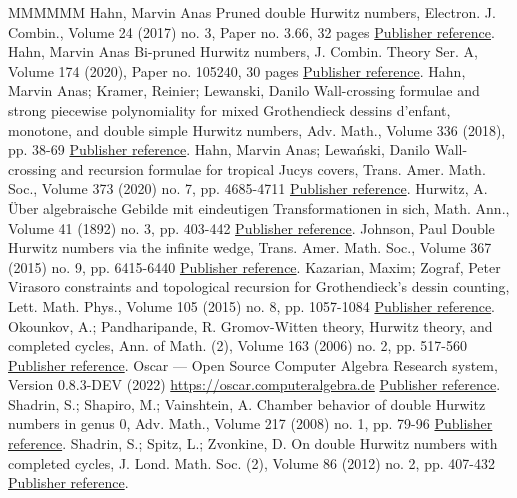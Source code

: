 \documentclass[11pt]{article}
\theoremstyle{definition}
\numberwithin{equation}{section}
\begin{document}
\begin{thebibliography}{MMMMMM}
 Hahn, Marvin Anas Pruned double Hurwitz numbers, Electron. J. Combin., Volume 24 (2017) no. 3, Paper no. 3.66, 32 pages \href{https://alco.centre-mersenne.org/articles/10.5802/alco.368/#zbMATH06791415}{Publisher reference}.
 Hahn, Marvin Anas Bi-pruned Hurwitz numbers, J. Combin. Theory Ser. A, Volume 174 (2020), Paper no. 105240, 30 pages \href{https://alco.centre-mersenne.org/articles/10.5802/alco.368/#hahn2020bi}{Publisher reference}.
 Hahn, Marvin Anas; Kramer, Reinier; Lewanski, Danilo Wall-crossing formulae and strong piecewise polynomiality for mixed Grothendieck dessins d’enfant, monotone, and double simple Hurwitz numbers, Adv. Math., Volume 336 (2018), pp. 38-69 \href{https://alco.centre-mersenne.org/articles/10.5802/alco.368/#hahn2018wall}{Publisher reference}.
 Hahn, Marvin Anas; Lewański, Danilo Wall-crossing and recursion formulae for tropical Jucys covers, Trans. Amer. Math. Soc., Volume 373 (2020) no. 7, pp. 4685-4711 \href{https://alco.centre-mersenne.org/articles/10.5802/alco.368/#hahn2020wall}{Publisher reference}.
 Hurwitz, A. Über algebraische Gebilde mit eindeutigen Transformationen in sich, Math. Ann., Volume 41 (1892) no. 3, pp. 403-442 \href{https://alco.centre-mersenne.org/articles/10.5802/alco.368/#hurwitz1892algebraische}{Publisher reference}.
 Johnson, Paul Double Hurwitz numbers via the infinite wedge, Trans. Amer. Math. Soc., Volume 367 (2015) no. 9, pp. 6415-6440 \href{https://alco.centre-mersenne.org/articles/10.5802/alco.368/#Joh15}{Publisher reference}.
 Kazarian, Maxim; Zograf, Peter Virasoro constraints and topological recursion for Grothendieck’s dessin counting, Lett. Math. Phys., Volume 105 (2015) no. 8, pp. 1057-1084 \href{https://alco.centre-mersenne.org/articles/10.5802/alco.368/#kazarian2015virasoro}{Publisher reference}.
 Okounkov, A.; Pandharipande, R. Gromov-Witten theory, Hurwitz theory, and completed cycles, Ann. of Math. (2), Volume 163 (2006) no. 2, pp. 517-560 \href{https://alco.centre-mersenne.org/articles/10.5802/alco.368/#okounkov2006gromov}{Publisher reference}.
 Oscar — Open Source Computer Algebra Research system, Version 0.8.3-DEV (2022) \url{https://oscar.computeralgebra.de} \href{https://alco.centre-mersenne.org/articles/10.5802/alco.368/#Oscar}{Publisher reference}.
 Shadrin, S.; Shapiro, M.; Vainshtein, A. Chamber behavior of double Hurwitz numbers in genus 0, Adv. Math., Volume 217 (2008) no. 1, pp. 79-96 \href{https://alco.centre-mersenne.org/articles/10.5802/alco.368/#SSV08}{Publisher reference}.
 Shadrin, S.; Spitz, L.; Zvonkine, D. On double Hurwitz numbers with completed cycles, J. Lond. Math. Soc. (2), Volume 86 (2012) no. 2, pp. 407-432 \href{https://alco.centre-mersenne.org/articles/10.5802/alco.368/#shadrin2012double}{Publisher reference}.
\end{thebibliography}
\end{document}
